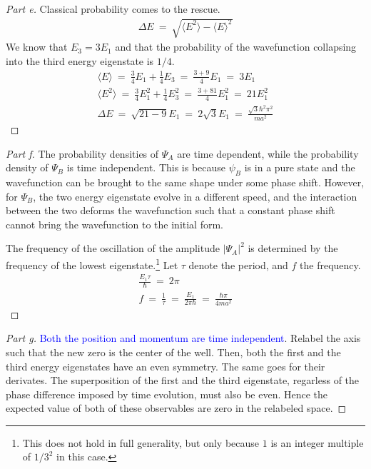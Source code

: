 \documentclass{article}
\numberwithin{equation}{section}
\def\<{{\langle}}
\def\>{{\rangle}}
\begin{document}
\begin{proof}
    [Part e] 
    Classical probability comes to the rescue. 
    \begin{align}
        \Delta E \ = \ \sqrt{\<E^2\> - \<E\>^2}
    \end{align}
    We know that $E_3 = 3E_1$ and that the probability of 
    the wavefunction collapsing into the third energy eigenstate 
    is $1/4$. 
    \begin{align}
        \<E\> \ = \ \frac {3} 4 E_1 + \frac{1} 4 E_3 \ = \ \frac {3 + 9} 4 E_1 \ = \ 3E_1 \\ 
        \<E^2\> \ = \ \frac {3} 4 E_1^2 + \frac 1 4 E_3^2 \ = \ \frac {3 + 81} 4 E_1^2 \ = \ 21 E_1^2 \\ 
        \boxed{\Delta E \ = \ \sqrt{21 - 9} E_1 \ = \ 2\sqrt 3 E_1 \ = \ \frac{\sqrt{3} \hbar^2 \pi^2}{m a^2}}
    \end{align}
\end{proof}

\begin{proof}
    [Part f] 
    The probability densities of $\Psi_A$ are time dependent, 
    while the probability density of $\Psi_B$ is time independent. 
    This is because $\psi_B$ is in a pure state and the wavefunction 
    can be brought to the same shape under some phase shift. However, for 
    $\Psi_B$, the two energy eigenstate evolve in a different speed, 
    and the interaction between the two deforms the wavefunction 
    such that a constant phase shift cannot bring the wavefunction to 
    the initial form. 

    The frequency of the oscillation of the amplitude $|\Psi_A|^2$ is 
    determined by the frequency of the lowest eigenstate.\footnote{This 
    does not hold in full generality, but only because $1$ is 
    an integer multiple of $1/3^2$ in this case.} Let $\tau$ 
    denote the period, and $f$ the frequency. 
    \begin{align}
        \frac {E_1 \tau} \hbar \ = \ 2 \pi \\ 
        \boxed{f \ = \ \frac 1 \tau \ = \ \frac {E_1}{2 \pi \hbar} \ = \ \frac{\hbar \pi }{4 m a^2}}
    \end{align}
\end{proof}

\begin{proof}
    [Part g]
    \textcolor{blue}{Both the position and momentum are time independent}. 
    Relabel the axis such that the new zero is the center of the well. 
    Then, both the first and the third energy eigenstates have an 
    even symmetry. The same goes for their derivates. The superposition 
    of the first and the third eigenstate, regarless of the phase 
    difference imposed by time evolution, must also be even. Hence 
    the expected value of both of these observables are zero in the 
    relabeled space. 
\end{proof}
\end{document}

